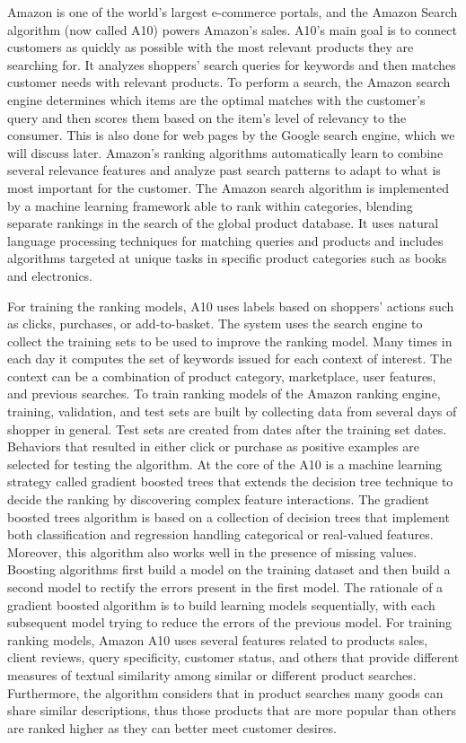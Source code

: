 Amazon is one of the world's largest e-commerce portals, and the Amazon Search algorithm (now called A10) powers Amazon's sales. A10's main goal is to connect customers as quickly as possible with the most relevant products they are searching for. It analyzes shoppers' search queries for keywords and then matches customer needs with relevant products. To perform a search, the Amazon search engine determines which items are the optimal matches with the customer's query and then scores them based on the item's level of relevancy to the consumer. This is also done for web pages by the Google search engine, which we will discuss later. Amazon's ranking algorithms automatically learn to combine several relevance features and analyze past search patterns to adapt to what is most important for the customer. The Amazon search algorithm is implemented by a machine learning framework able to rank within categories, blending separate rankings in the search of the global product database. It uses natural language processing techniques for matching queries and products and includes algorithms targeted at unique tasks in specific product categories such as books and electronics.

For training the ranking models, A10 uses labels based on shoppers' actions such as clicks, purchases, or add-to-basket. The system uses the search engine to collect the training sets to be used to improve the ranking model. Many times in each day it computes the set of keywords issued for each context of interest. The context can be a combination of product category, marketplace, user features, and previous searches. To train ranking models of the Amazon ranking engine, training, validation, and test sets are built by collecting data from several days of shopper in general. Test sets are created from dates after the training set dates. Behaviors that resulted in either click or purchase as positive examples are selected for testing the algorithm. At the core of the A10 is a machine learning strategy called gradient boosted trees that extends the decision tree technique to decide the ranking by discovering complex feature interactions. The gradient boosted trees algorithm is based on a collection of decision trees that implement both classification and regression handling categorical or real-valued features. Moreover, this algorithm also works well in the presence of missing values. Boosting algorithms first build a model on the training dataset and then build a second model to rectify the errors present in the first model. The rationale of a gradient boosted algorithm is to build learning models sequentially, with each subsequent model trying to reduce the errors of the previous model. For training ranking models, Amazon A10 uses several features related to products sales, client reviews, query specificity, customer status, and others that provide different measures of textual similarity among similar or different product searches. Furthermore, the algorithm \hbox{considers} that in product searches many goods can share similar descriptions, thus those products that are more popular than others are ranked higher as they can better meet customer desires.

